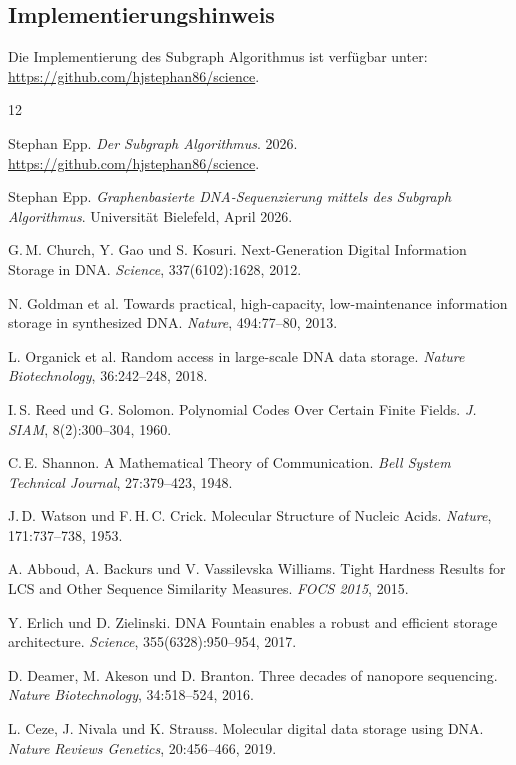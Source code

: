 ﻿\documentclass[a4paper,12pt]{article}
\theoremstyle{definition}
\begin{document}
\subsection{Implementierungshinweis}

Die Implementierung des Subgraph Algorithmus ist verfügbar unter:
\url{https://github.com/hjstephan86/science}.

\begin{thebibliography}{12}

        Stephan Epp.
        \textit{Der Subgraph Algorithmus}. 2026.
        \url{https://github.com/hjstephan86/science}.

        Stephan Epp.
        \textit{Graphenbasierte DNA-Sequenzierung mittels des Subgraph
        Algorithmus}.
        Universit\"{a}t Bielefeld, April 2026.

        G.\,M. Church, Y. Gao und S. Kosuri.
        Next-Generation Digital Information Storage in DNA.
        \textit{Science}, 337(6102):1628, 2012.

        N. Goldman et al.
        Towards practical, high-capacity, low-maintenance information
        storage in synthesized DNA.
        \textit{Nature}, 494:77--80, 2013.

        L. Organick et al.
        Random access in large-scale DNA data storage.
        \textit{Nature Biotechnology}, 36:242--248, 2018.

        I.\,S. Reed und G. Solomon.
        Polynomial Codes Over Certain Finite Fields.
        \textit{J. SIAM}, 8(2):300--304, 1960.

        C.\,E. Shannon.
        A Mathematical Theory of Communication.
        \textit{Bell System Technical Journal}, 27:379--423, 1948.

        J.\,D. Watson und F.\,H.\,C. Crick.
        Molecular Structure of Nucleic Acids.
        \textit{Nature}, 171:737--738, 1953.

        A. Abboud, A. Backurs und V. Vassilevska Williams.
        Tight Hardness Results for LCS and Other Sequence Similarity
        Measures.
        \textit{FOCS 2015}, 2015.

        Y. Erlich und D. Zielinski.
        DNA Fountain enables a robust and efficient storage architecture.
        \textit{Science}, 355(6328):950--954, 2017.

        D. Deamer, M. Akeson und D. Branton.
        Three decades of nanopore sequencing.
        \textit{Nature Biotechnology}, 34:518--524, 2016.

        L. Ceze, J. Nivala und K. Strauss.
        Molecular digital data storage using DNA.
        \textit{Nature Reviews Genetics}, 20:456--466, 2019.

\end{thebibliography}
\end{document}
